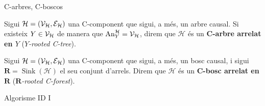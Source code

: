 \documentclass{bestbeamer}
\begin{document}
\begin{frame}{C-arbres, C-boscos}\label{frame:def-formal-Cboscos}
\begin{definition}\label{def:c_arbre}
Sigui $\mathcal{H}=(\mathcal{V}_{\mathcal{H}},\mathcal{E}_{\mathcal{H}})$ una C-component que sigui, a més, un arbre causal. Si existeix $Y\in \mathcal{V}_{\mathcal{H}}$ de manera que $\operatorname{An}_{Y}^{\mathcal{H}}=\mathcal{V}_{\mathcal{H}}$, direm que $\mathcal{H}$ és un \textbf{C-arbre arrelat en $Y$} (\textit{$Y$-rooted C-tree}).
\end{definition}
\begin{definition}\label{def:c_bosc}
Sigui $\mathcal{H}=(\mathcal{V}_{\mathcal{H}},\mathcal{E}_{\mathcal{H}})$ una C-component que sigui, a més, un bosc causal, i sigui $\mathbf{R}=\operatorname{Sink}(\mathcal{H})$ el seu conjunt d'arrels. Direm que $\mathcal{H}$ és un \textbf{C-bosc arrelat en $\mathbf{R}$} (\textit{$\mathbf{R}$-rooted C-forest}).
\end{definition}
\hfill{}
\end{frame}

\begin{frame}{Algorisme ID I}\label{frame:algorismeid}
  \begin{algorithm}
    \begin{bestpseudo}
    \end{bestpseudo}
  \end{algorithm}
\end{frame}
\end{document}
